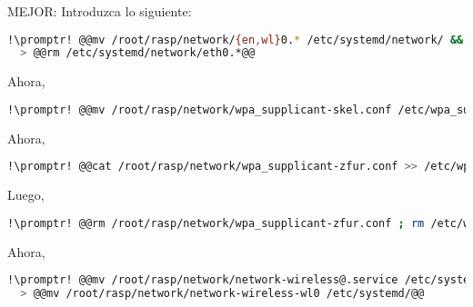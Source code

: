 MEJOR: Introduzca lo siguiente:
%
%

\begin{lstlisting}[gobble=2,language=bash,style=bashinteract,escapechar=!]
  !\promptr! @@mv /root/rasp/network/{en,wl}0.* /etc/systemd/network/ && \ @@
  > @@rm /etc/systemd/network/eth0.*@@
\end{lstlisting}

Ahora,

\begin{lstlisting}[gobble=2,language=bash,style=bashinteract,escapechar=!]
  !\promptr! @@mv /root/rasp/network/wpa_supplicant-skel.conf /etc/wpa_supplicant/wpa_supplicant-wl0.conf@@
\end{lstlisting}

Ahora,

\begin{lstlisting}[gobble=2,language=bash,style=bashinteract,escapechar=!]
  !\promptr! @@cat /root/rasp/network/wpa_supplicant-zfur.conf >> /etc/wpa_supplicant/wpa_supplicant-wl0.conf@@
\end{lstlisting}

Luego,

\begin{lstlisting}[gobble=2,language=bash,style=bashinteract,escapechar=!]
  !\promptr! @@rm /root/rasp/network/wpa_supplicant-zfur.conf ; rm /etc/wpa_supplicant/wpa_supplicant.conf@@
\end{lstlisting}

Ahora,

\begin{lstlisting}[gobble=2,language=bash,style=bashinteract,escapechar=!]
  !\promptr! @@mv /root/rasp/network/network-wireless@.service /etc/systemd/system/ && \ @@
  > @@mv /root/rasp/network/network-wireless-wl0 /etc/systemd/@@
\end{lstlisting}






















